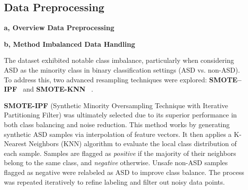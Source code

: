 \documentclass[conference]{IEEEtran}
\begin{document}
\subsection{Data Preprocessing}
\textbf{a, Overview Data Preprocessing}
\begin{table}[H]
\caption{Data Preprocessing Steps for private dataset}
\label{tab:preprocessing}
\centering
{}
\end{table}


\textbf{b, Method Imbalanced Data Handling}

The dataset exhibited notable class imbalance, particularly when considering ASD as the minority class in binary classification settings (ASD vs. non-ASD). To address this, two advanced resampling techniques were explored: \textbf{SMOTE–IPF}~\cite{b14} and \textbf{SMOTE-KNN} ~\cite{b15}.

\textbf{SMOTE-IPF} (Synthetic Minority Oversampling Technique with Iterative Partitioning Filter) was ultimately selected due to its superior performance in both class balancing and noise reduction. This method works by generating synthetic ASD samples via interpolation of feature vectors. It then applies a K-Nearest Neighbors (KNN) algorithm to evaluate the local class distribution of each sample. Samples are flagged as \textit{positive} if the majority of their neighbors belong to the same class, and \textit{negative} otherwise. Unsafe non-ASD samples flagged as negative were relabeled as ASD to improve class balance. The process was repeated iteratively to refine labeling and filter out noisy data points.
\end{document}
